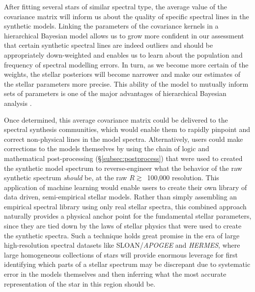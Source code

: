 \documentclass[iop,floatfix]{emulateapj}
\begin{document}
After fitting several stars of similar spectral type, the average value of the covariance matrix will inform us about the quality of specific spectral lines in the synthetic models. Linking the parameters of the covariance kernels in a hierarchical Bayesian model allows us to grow more confident in our assessment that certain synthetic spectral lines are indeed outliers and should be appropriately down-weighted and enables us to learn about the population and frequency of spectral modelling errors. In turn, as we become more certain of the weights, the stellar posteriors will become narrower and make our estimates of the stellar parameters more precise. This ability of the model to mutually inform sets of parameters is one of the major advantages of hierarchical Bayesian analysis \citep{kruschke10}.

Once determined, this average covariance matrix could be delivered to the spectral synthesis communities, which would enable them to rapidly pinpoint and correct non-physical lines in the model spectra. Alternatively, users could make corrections to the models themselves by using the chain of logic and mathematical post-processing (\S\ref{subsec:postprocess}) that were used to created the synthetic model spectrum to reverse-engineer what the behavior of the raw synthetic spectrum \emph{should} be, at the raw $R \gtrsim$~100,000 resolution. This application of machine learning would enable users to create their own library of data driven, semi-empirical stellar models. Rather than simply assembling an empirical spectral library using only real stellar spectra, this combined approach naturally provides a physical anchor point for the fundamental stellar parameters, since they are tied down by the laws of stellar physics that were used to create the synthetic spectra. Such a technique holds great promise in the era of large high-resolution spectral datasets like SLOAN/\emph{APOGEE} and \emph{HERMES}, where large homogeneous collections of stars will provide enormous leverage for first identifying which parts of a stellar spectrum may be discrepant due to systematic error in the models themselves and then inferring what the most accurate representation of the star in this region should be. 
\end{document}
